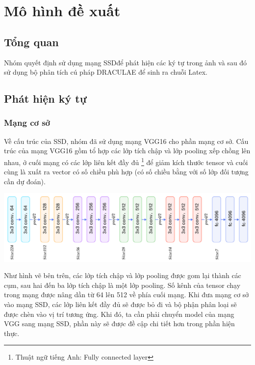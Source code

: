 \documentclass[a4paper,12pt]{article}
\begin{document}
	
	\newpage
	\section{Mô hình đề xuất}
	
	\subsection{Tổng quan}
	
	Nhóm quyết định sử dụng mạng SSD\cite{liu2016ssd}để phát hiện các ký tự trong ảnh và sau đó sử dụng bộ phân tích cú pháp DRACULAE\cite{zanibbi} để sinh ra chuỗi Latex.
	
	\subsection{Phát hiện ký tự}
	
	\subsubsection{Mạng cơ sở}
	
	Về cấu trúc của SSD\cite{liu2016ssd}, nhóm đã sử dụng mạng VGG16\cite{simonyan2014very} cho phần mạng cơ sở. Cấu trúc của mạng VGG16\cite{simonyan2014very} gồm tổ hợp các lớp tích chập và lớp pooling xếp chồng lên nhau, ở cuối mạng có các lớp liên kết đầy đủ \footnote{Thuật ngữ tiếng Anh: Fully connected layer} để giảm kích thước tensor và cuối cùng là xuất ra vector có số chiều phù hợp (có số chiều bằng với số lớp đối tượng cần dự đoán).
	
	\begin{center}
		
		\centering
		\includegraphics[width=0.8\linewidth]{vgg16.png}
		\vspace{0.5cm}
	\end{center}
	
	Như hình vẽ bên trên, các lớp tích chập và lớp pooling được gom lại thành các cụm, sau hai đến ba lớp tích chập là một lớp pooling. Số kênh của tensor chạy trong mạng được nâng dần từ 64 lên 512 về phía cuối mạng. Khi đưa mạng cơ sở vào mạng SSD\cite{liu2016ssd}, các lớp liên kết đầy đủ sẽ được bỏ đi và bộ phận phân loại sẽ được chèn vào vị trí tương ứng. Khi đó, ta cần phải chuyển model của mạng VGG\cite{simonyan2014very} sang mạng SSD\cite{liu2016ssd}, phần này sẽ được đề cập chi tiết hơn trong phần hiện thực.
	
\end{document}
